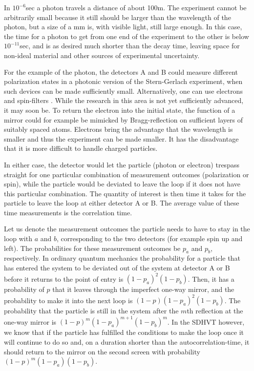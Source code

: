 \documentclass[12pt]{article}                    %
\begin{document}
In $10^{-6}$sec a photon travels a distance of about 100m. The
experiment cannot be arbitrarily small because it still should
be larger than the
wavelength of the photon, but a size of a mm is, with visible light, still large
enough. In this case, the time for a photon to get from one end of
the experiment to the other is below $10^{-11}$sec, and 
is as desired much shorter than the decay time, leaving space for
non-ideal material and other sources of experimental uncertainty. 

For the example of the 
photon, the detectors A and B could measure different polarization states in a photonic 
version of the Stern-Gerlach experiment, when such devices can
be made sufficiently small. Alternatively, one can use electrons and
spin-filters \cite{spinfilter}. While 
the research in this area is not yet sufficiently advanced, it may
soon be. To return the electron into
the initial state, the function of a mirror could
for example be mimicked by Bragg-reflection on sufficient layers of suitably 
spaced atoms. 
Electrons bring the advantage that the
wavelength is smaller and thus the experiment can be made smaller. It has
the disadvantage that it is more difficult to handle charged particles. 

In either case, the detector would let the particle (photon or electron)
trespass straight for one particular combination of measurement outcomes 
(polarization or spin), while the particle would be deviated to
leave the loop if it does not have this particular combination. The quantity
of interest is then time it takes for the particle to leave the loop at
either detector A or B. The average value of these time measurements is 
the correlation time.

Let us
denote the measurement outcomes the particle needs to have to stay
in the loop with $a$ and $b$, corresponding to the two detectors (for
example spin up and left).
The probabilities for these measurement outcomes be $p_a$ and $p_b$,
respectively.
In ordinary quantum mechanics the probability for a particle that 
has entered the system to be deviated out of the system at detector
A or B before it
returns to the point of entry is $(1-p_a)^2 (1-p_b)$. Then, it has a 
probability of $p$ that it leaves through the imperfect one-way mirror, and 
the probability to make it into the next loop is $(1-p)(1-p_a)^2(1-p_b)$. 
The probability that the particle is still in the system after the $m$th 
reflection at the one-way mirror is $(1-p)^{m} (1-p_a)^{m+1} (1-p_b)^m$. 
In the {\sc SDHVT} however, we know that if the particle has fulfilled the
conditions to make the loop once it will continue to do so and, on a duration shorter than
the autocorrelation-time, it should return to the mirror on the
second screen with probability $(1-p)^m (1-p_a) (1-p_b)$. 
\end{document}
